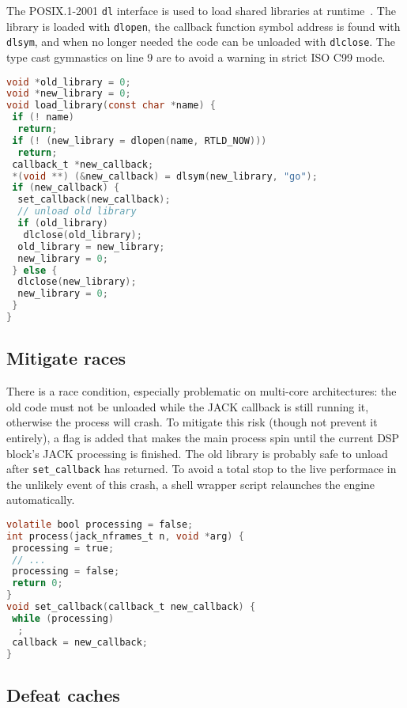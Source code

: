 \documentclass[11pt,a4paper]{article}
\begin{document}
The POSIX.1-2001 \lstinline!dl! interface is used to load shared libraries
at runtime~\cite{DL}. The library is loaded with \lstinline!dlopen!, the
callback function symbol address is found with \lstinline!dlsym!, and when
no longer needed the code can be unloaded with \lstinline!dlclose!.  The type
cast gymnastics on line 9 are to avoid a warning in strict ISO C99 mode.

\begin{lstlisting}[language=C, caption={Using libdl}, label=llibdl]
void *old_library = 0;
void *new_library = 0;
void load_library(const char *name) {
 if (! name)
  return;
 if (! (new_library = dlopen(name, RTLD_NOW)))
  return;
 callback_t *new_callback;
 *(void **) (&new_callback) = dlsym(new_library, "go");
 if (new_callback) {
  set_callback(new_callback);
  // unload old library
  if (old_library)
   dlclose(old_library);
  old_library = new_library;
  new_library = 0;
 } else {
  dlclose(new_library);
  new_library = 0;
 }
}
\end{lstlisting}

\subsection{Mitigate races}\label{mitigate-races}

There is a race condition, especially problematic on multi-core
architectures: the old code must not be unloaded while the JACK callback
is still running it, otherwise the process will crash. To mitigate this
risk (though not prevent it entirely), a flag is added that makes the
main process spin until the current DSP block's JACK processing is
finished. The old library is probably safe to unload after
\lstinline!set_callback! has returned. To avoid a total stop to the live
performace in the unlikely event of this crash, a shell wrapper script
relaunches the engine automatically.

\begin{lstlisting}[language=C, caption={Race mitigation}, label=lrace]
volatile bool processing = false;
int process(jack_nframes_t n, void *arg) {
 processing = true;
 // ...
 processing = false;
 return 0;
}
void set_callback(callback_t new_callback) {
 while (processing)
  ;
 callback = new_callback;
}
\end{lstlisting}

\subsection{Defeat caches}\label{defeat-caches}
\end{document}
